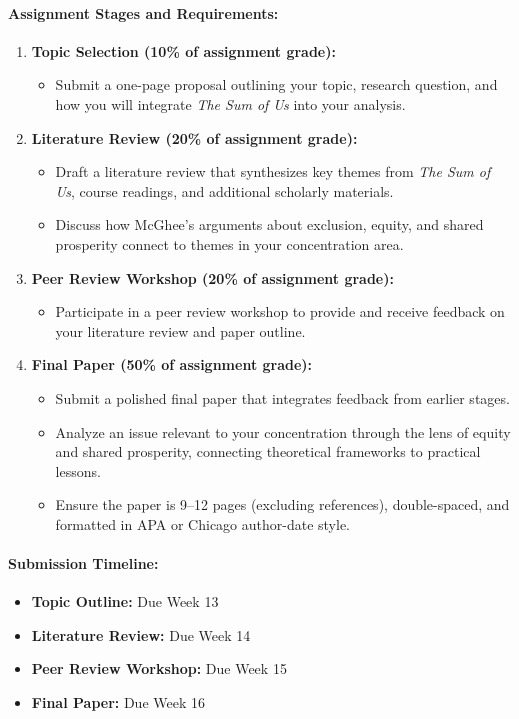\documentclass[12pt]{article}     %
\begin{document}
\paragraph*{Assignment Stages and Requirements:}
\begin{enumerate}
    \item \textbf{Topic Selection (10\% of assignment grade):}
    \begin{itemize}
        \item Submit a one-page proposal outlining your topic, research question, and how you will integrate \textit{The Sum of Us} into your analysis.
    \end{itemize}
    \item \textbf{Literature Review (20\% of assignment grade):}
    \begin{itemize}
        \item Draft a literature review that synthesizes key themes from \textit{The Sum of Us}, course readings, and additional scholarly materials.
        \item Discuss how McGhee's arguments about exclusion, equity, and shared prosperity connect to themes in your concentration area.
    \end{itemize}
    \item \textbf{Peer Review Workshop (20\% of assignment grade):}
    \begin{itemize}
        \item Participate in a peer review workshop to provide and receive feedback on your literature review and paper outline.
    \end{itemize}
    \item \textbf{Final Paper (50\% of assignment grade):}
    \begin{itemize}
        \item Submit a polished final paper that integrates feedback from earlier stages.
        \item Analyze an issue relevant to your concentration through the lens of equity and shared prosperity, connecting theoretical frameworks to practical lessons.
        \item Ensure the paper is 9--12 pages (excluding references), double-spaced, and formatted in APA or Chicago author-date style.
    \end{itemize}
\end{enumerate}

\paragraph*{Submission Timeline:}
\begin{itemize}
    \item \textbf{Topic Outline:} Due Week 13
    \item \textbf{Literature Review:} Due Week 14
    \item \textbf{Peer Review Workshop:} Due Week 15
    \item \textbf{Final Paper:} Due Week 16
\end{itemize}
\end{document}

